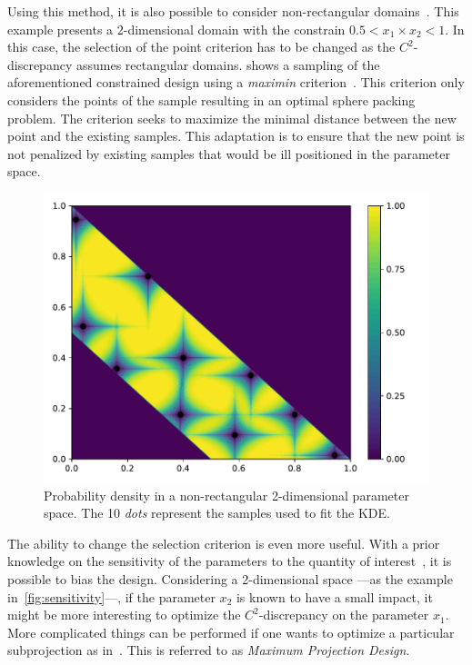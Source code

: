 

Using this method, it is also possible to consider non-rectangular domains~\citep{Lekivetz2015}. This example presents a 2-dimensional domain with the constrain $0.5 < x_1 \times x_2 < 1$. In this case, the selection of the point criterion has to be changed as the $C^2$-discrepancy assumes rectangular domains.  shows a sampling of the aforementioned constrained design using a \emph{maximin} criterion~\citep{Fang2006}. This criterion only considers the points of the sample resulting in an optimal sphere packing problem. The criterion seeks to maximize the minimal distance between the new point and the existing samples. This adaptation is to ensure that the new point is not penalized by existing samples that would be ill positioned in the parameter space.

\begin{figure}[!h]
\centering
\includegraphics[width=0.9\linewidth,keepaspectratio]{fig/contributions/doe/10_star_constrain.pdf}
\caption{Probability density in a non-rectangular 2-dimensional parameter space. The 10 \emph{dots} represent the samples used to fit the KDE.}
\label{fig:constrain}
\end{figure}

The ability to change the selection criterion is even more useful. With a prior knowledge on the sensitivity of the parameters to the quantity of interest~\citep{Saltelli2007}, it is possible to bias the design. Considering a 2-dimensional space ---\thinspace as the example in~\cref{fig:sensitivity}\thinspace---, if the parameter $x_2$ is known to have a small impact, it might be more interesting to optimize the $C^2$-discrepancy on the parameter $x_1$. More complicated things can be performed if one wants to optimize a particular subprojection as in~\citep{Joseph2015}. This is referred to as \emph{Maximum Projection Design}.

